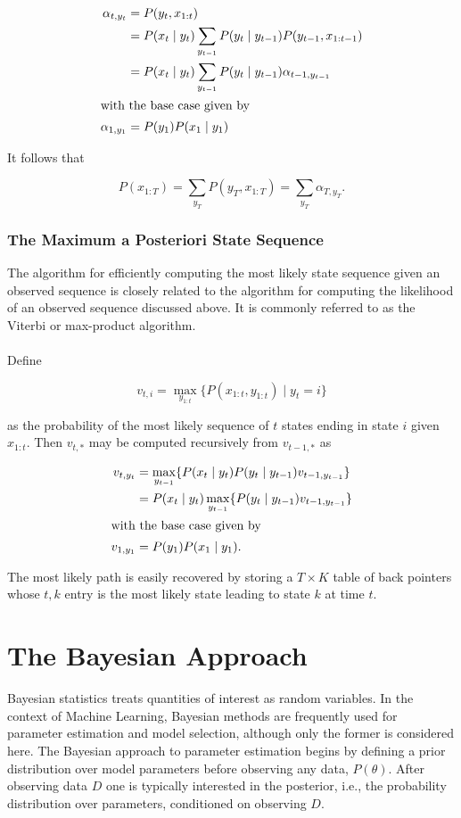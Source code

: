 \documentclass[12pt]{report}
\newcommand{\1}[0]{\mathbbm{1}}
\newcommand{\seq}[3]{\ensuremath{#1_{{#2}:{#3}}}}
\begin{document}
\begin{align*}
    \alpha_{t,y_t}
    &= P(y_t, \seq{x}{1}{t}) \\
    &= P(x_t \mid y_t) \sum_{y_{t-1}} P(y_t \mid y_{t-1}) P(y_{t-1}, \seq{x}{1}{t-1}) \\
    &= P(x_t \mid y_t) \sum_{y_{t-1}} P(y_t \mid y_{t-1}) \alpha_{t-1,y_{t-1}} \\
\intertext{with the base case given by}
    \alpha_{1,y_1} &= P(y_1)P(x_1 \mid y_1)\\
\end{align*}

It follows that

\[
    P(\seq{x}{1}{T}) = \sum_{y_T} P(y_T, \seq{x}{1}{T}) = \sum_{y_T} \alpha_{T,y_T}.
\]

\subsubsection{The Maximum a Posteriori State Sequence}
The algorithm for efficiently computing the most likely state sequence given an
observed sequence is closely related to the algorithm for computing the likelihood
of an observed sequence discussed above.
It is commonly referred to as the Viterbi or max-product algorithm.
\\\\
Define

\[
    v_{t,i} = \max_{\seq{y}{1}{t}}\{P(\seq{x}{1}{t}, \seq{y}{1}{t}) \mid y_t = i\}
\]

as the probability of the most likely sequence of $t$ states ending in state $i$
given $\seq{x}{1}{t}$. Then $v_{t,*}$ may be computed recursively from $v_{t-1,*}$ as

\begin{align*}
    v_{t,y_t}
    &= \max_{y_{t-1}}\{ P(x_{t} \mid y_t) P(y_t \mid y_{t-1}) v_{t-1,y_{t-1}} \} \\
    &= P(x_t \mid y_t) \max_{y_{t-1}}\{ P(y_t \mid y_{t-1}) v_{t-1,y_{t-1}} \} \\
\intertext{with the base case given by}
    v_{1,y_1} &= P(y_1)P(x_1 \mid y_1).
\end{align*}

The most likely path is easily recovered by storing a $T \times K$ table of back pointers
whose $t,k$ entry is the most likely state leading to state $k$ at time $t$.

\section{The Bayesian Approach}
Bayesian statistics treats quantities of interest as random variables.
In the context of Machine Learning, Bayesian methods are frequently used
for parameter estimation and model selection, although only the former is
considered here. The Bayesian approach to parameter estimation begins by
defining a prior distribution over model parameters before observing any data,
$P(\theta)$. After observing data $D$ one is typically interested in the
posterior, i.e., the probability distribution over parameters, conditioned on observing
$D$.
\end{document}
